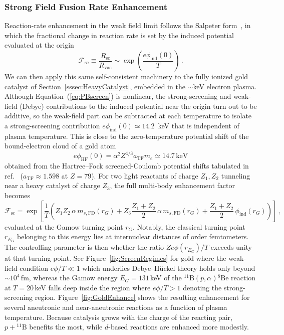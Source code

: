 \documentclass[particles,article,accept,pdftex,moreauthors]{Definitions/mdpi}
\newcommand{\req}[1]{Equation~(\ref{#1})}
\newcommand{\rf}[1]{Figure~\ref{#1}}
\newcommand{\rsec}[1]{Section~\ref{#1}}
\begin{document}
\subsubsection{Strong Field Fusion Rate Enhancement}\label{sssec:FusionEnhancement}
Reaction-rate enhancement in the weak field limit follows the Salpeter form~\cite{Salpeter:1954nc}, in which the fractional change in reaction rate is set by the induced potential evaluated at the origin
\begin{equation}\label{eq:salpeter}
\mathcal{F}_\mathrm{sc} \equiv \frac{R_\mathrm{sc}}{R_\mathrm{vac}} \sim \exp\!\left(\frac{e\phi_\mathrm{ind}(0)}{T}\right)\,.
\end{equation}
We can then apply this same self-consistent machinery to the fully ionized gold catalyst of \rsec{sssec:HeavyCatalyst}, embedded in the $\sim$keV electron plasma. Although \req{eq:PBscreen} is nonlinear, the strong-screening and weak-field (Debye) contributions to the induced potential near the origin turn out to be additive, so the weak-field part can be subtracted at each temperature to isolate a strong-screening contribution $e\phi_\mathrm{ind}(0)\simeq14.2$~keV that is independent of plasma temperature. This is close to the zero-temperature potential shift of the bound-electron cloud of a gold atom
\begin{equation}
 e\phi_\mathrm{HF}(0)=\alpha^2Z^{4/3}a_\mathrm{TF}m_e\simeq14.7\,\mathrm{keV}
\end{equation}
obtained from the Hartree--Fock screened-Coulomb potential shifts tabulated in ref.~\cite{garrett1967potential} ($a_\mathrm{TF}\approx1.598$ at $Z=79$). For two light reactants of charge $Z_1,Z_2$ tunneling near a heavy catalyst of charge $Z_3$, the full multi-body enhancement factor becomes
\begin{equation}\label{eq:goldF}
\mathcal{F}_\mathrm{sc} = \exp\!\left[\frac{1}{T}\left(Z_1Z_2\,\alpha\, m_{s,\mathrm{FD}}(r_G) + Z_3\frac{Z_1+Z_2}{2}\,\alpha\, m_{s,\mathrm{FD}}(r_G) + \frac{Z_1+Z_2}{2}\,\phi_\mathrm{ind}(r_G)\right)\right]\,,
\end{equation}
evaluated at the Gamow turning point $r_G$. Notably, the classical turning point $r_{E_G}$ belonging to this energy lies at internuclear distances of order femtometers. The controlling parameter is then whether the ratio $Ze\phi(r_{E_G})/T$ exceeds unity at that turning point. See \rf{fig:ScreenRegimes} for gold where the weak-field condition $e\phi/T\ll1$ which underlies Debye--H\"uckel theory holds only beyond ${\sim}10^4$\,fm, whereas the Gamow energy $E_G=131$\,keV of the ${}^{11}\mathrm{B}(p,\alpha){}^{8}\mathrm{Be}$ reaction at $T=20$\,keV falls deep inside the region where $e\phi/T>1$ denoting the strong-screening region. \rf{fig:GoldEnhance} shows the resulting enhancement for several aneutronic and near-aneutronic reactions as a function of plasma temperature. Because catalysis grows with the charge of the reacting pair, $p+{}^{11}\mathrm{B}$ benefits the most, while $d$-based reactions are enhanced more modestly.
\end{document}
